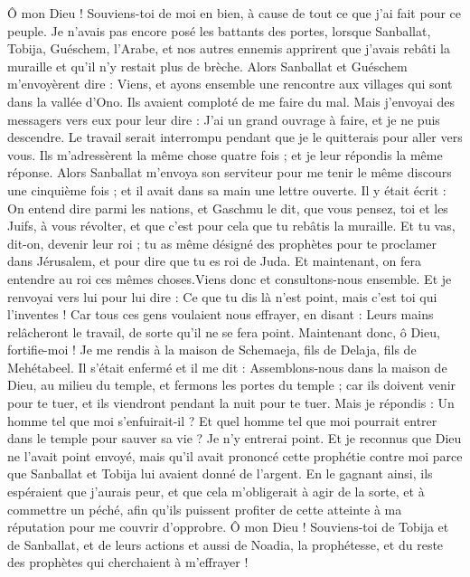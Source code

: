 \begin{multicols}{2}
Ô mon Dieu ! Souviens-toi de moi en bien, à cause de tout ce que j'ai fait pour ce peuple.
\VerseOne{}Je n'avais pas encore posé les battants des portes, lorsque Sanballat, Tobija, Guéschem, l'Arabe, et nos autres ennemis apprirent que j'avais rebâti la muraille et qu'il n'y restait plus de brèche.
Alors Sanballat et Guéschem m’envoyèrent dire : Viens, et ayons ensemble une rencontre aux villages qui sont dans la vallée d'Ono. Ils avaient comploté de me faire du mal.
Mais j'envoyai des messagers vers eux pour leur dire : J’ai un grand ouvrage à faire, et je ne puis descendre. Le travail serait interrompu pendant que je le quitterais pour aller vers vous.
Ils m'adressèrent la même chose quatre fois ; et je leur répondis la même réponse.
Alors Sanballat m’envoya son serviteur pour me tenir le même discours une cinquième fois ; et il avait dans sa main une lettre ouverte.
Il y était écrit : On entend dire parmi les nations, et Gaschmu le dit, que vous pensez, toi et les Juifs, à vous révolter, et que c'est pour cela que tu rebâtis la muraille. Et tu vas, dit-on, devenir leur roi ;
tu as même désigné des prophètes pour te proclamer dans Jérusalem, et pour dire que tu es roi de Juda. Et maintenant, on fera entendre au roi ces mêmes choses.Viens donc et consultons-nous ensemble.
Et je renvoyai vers lui pour lui dire : Ce que tu dis là n'est point, mais c'est toi qui l'inventes !
Car tous ces gens voulaient nous effrayer, en disant : Leurs mains relâcheront le travail, de sorte qu'il ne se fera point. Maintenant donc, ô Dieu, fortifie-moi !
Je me rendis à la maison de Schemaeja, fils de Delaja, fils de Mehétabeel. Il s'était enfermé et il me dit : Assemblons-nous dans la maison de Dieu, au milieu du temple, et fermons les portes du temple ; car ils doivent venir pour te tuer, et ils viendront pendant la nuit pour te tuer.
Mais je répondis : Un homme tel que moi s'enfuirait-il ? Et quel homme tel que moi pourrait entrer dans le temple pour sauver sa vie ? Je n'y entrerai point.
Et je reconnus que Dieu ne l'avait point envoyé, mais qu'il avait prononcé cette prophétie contre moi parce que Sanballat et Tobija lui avaient donné de l'argent.
En le gagnant ainsi, ils espéraient que j'aurais peur, et que cela m’obligerait à agir de la sorte, et à commettre un péché, afin qu'ils puissent profiter de cette atteinte à ma réputation pour me couvrir d'opprobre.
Ô mon Dieu ! Souviens-toi de Tobija et de Sanballat, et de leurs actions et aussi de Noadia, la prophétesse, et du reste des prophètes qui cherchaient à m'effrayer !

\end{multicols}
